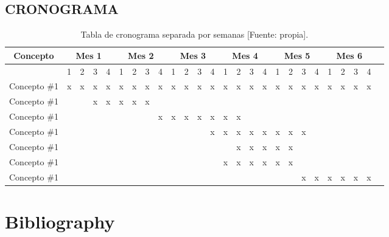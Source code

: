 \documentclass[12pt,letterpaper]{article}
\begin{document}
\begin{landscape}
	\section{CRONOGRAMA}
	\begin{table}[htb]
		\caption{Tabla de cronograma separada por semanas [Fuente: propia].}
		\label{tab:Cronograma}	
		\begin{tabular}{|c|c|c|c|c|c|c|c|c|c|c|c|c|c|c|c|c|c|c|c|c|c|c|c|c|c|}
			\hline
			\rowcolor{Gray}
			\textbf{Concepto} & \multicolumn{4}{c|}{\textbf{Mes 1}} & \multicolumn{4}{c|}{\textbf{Mes 2}} & \multicolumn{4}{c|}{\textbf{Mes 3}} & \multicolumn{4}{c|}{\textbf{Mes 4}} & \multicolumn{4}{c|}{\textbf{Mes 5}} & \multicolumn{4}{c|}{\textbf{Mes 6}} & \multicolumn{1}{|p{2cm}|}{\textbf{}} \\\hline
			
			& 1 & 2 & 3 & 4 & 1 & 2 & 3 & 4 & 1 & 2 & 3 & 4 & 1 & 2 & 3 & 4 & 1 & 2 & 3 & 4 & 1 & 2 & 3 & 4 & \\ \hline
			
			\multicolumn{1}{|p{4.5cm}|}{Concepto \#1} & x & x & x & x & x & x & x & x & x & x & x & x & x & x & x & x & x & x & x & x & x & x & x & x & \\ \hline
			
			\multicolumn{1}{|p{4.5cm}|}{Concepto \#1} &  &  & x & x & x & x & x &  &  &  &  &  &  &  &  &  &  &  &  &  &  &  &  &  & \\ \hline
			
			\multicolumn{1}{|p{4.5cm}|}{Concepto \#1} &  &  &  &  &  &  &  & x & x & x & x & x & x & x &  &  &  &  &  &  &  &  &  &  & \\ \hline
			
			\multicolumn{1}{|p{4.5cm}|}{Concepto \#1} &  &  &  &  &  &  &  &  &  &  &  & x & x & x & x & x & x & x & x &  &  &  &  &  & \\ \hline
			
			\multicolumn{1}{|p{4.5cm}|}{Concepto \#1} &  &  &  &  &  &  &  &  &  &  &  &  &  & x & x & x & x & x &  &  &  &  &  &  & \\ \hline
			
			\multicolumn{1}{|p{4.5cm}|}{Concepto \#1} &  &  &  &  &  &  &  &  &  &  &  &  & x & x & x & x & x & x &  &  &  &  &  &  & \\ \hline
			
			\multicolumn{1}{|p{4.5cm}|}{Concepto \#1} &  &  &  &  &  &  &  &  &  &  &  &  &  &  &  &  &  &  & x & x & x & x & x & x & \\ \hline				 
			
		\end{tabular}
	\end{table}
\end{landscape} 


\section{Bibliography}



\end{document}
